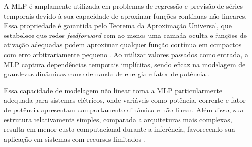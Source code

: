 A MLP é amplamente utilizada em problemas de regressão e previsão de séries temporais devido à sua capacidade de aproximar funções contínuas não lineares. Essa propriedade é garantida pelo Teorema da Aproximação Universal, que estabelece que redes \textit{feedforward} com ao menos uma camada oculta e funções de ativação adequadas podem aproximar qualquer função contínua em compactos com erro arbitrariamente pequeno \cite{Cybenko1989, Hornik1989}. Ao utilizar valores passados como entrada, a MLP captura dependências temporais implícitas, sendo eficaz na modelagem de grandezas dinâmicas como demanda de energia e fator de potência \cite{Amjady2009, Andrade2015}.

Essa capacidade de modelagem não linear torna a MLP particularmente adequada para sistemas elétricos, onde variáveis como potência, corrente e fator de potência apresentam comportamento dinâmico e não linear. Além disso, sua estrutura relativamente simples, comparada a arquiteturas mais complexas, resulta em menor custo computacional durante a inferência, favorecendo sua aplicação em sistemas com recursos limitados \cite{Sarker2021}.

